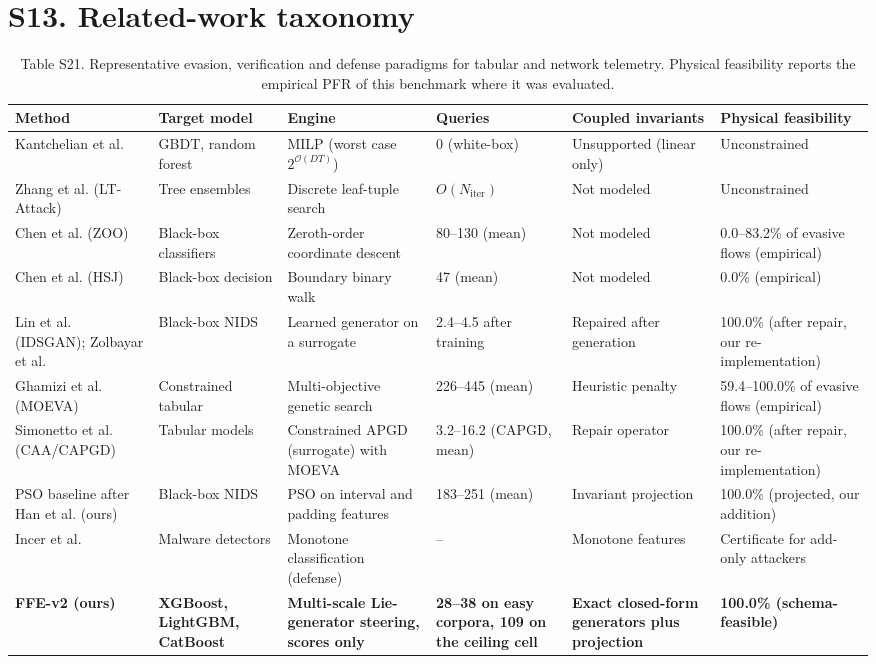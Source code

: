 \section*{S13. Related-work taxonomy}

\begin{table}[!htbp]
\caption*{Table S21. Representative evasion, verification and defense paradigms for tabular and network telemetry. Physical feasibility reports the empirical PFR of this benchmark where it was evaluated.}
\centering
\linespread{1}\selectfont
\footnotesize
\setlength{\tabcolsep}{4pt}
\begin{tabular}{@{}p{2.0cm}p{1.6cm}p{2.4cm}p{1.9cm}p{2.1cm}p{2.1cm}@{}}
\toprule
\textbf{Method} & \textbf{Target model} & \textbf{Engine} & \textbf{Queries} & \textbf{Coupled invariants} & \textbf{Physical feasibility} \\
\midrule
Kantchelian et al. & GBDT, random forest & MILP (worst case $2^{\mathcal{O}(DT)}$) & 0 (white-box) & Unsupported (linear only) & Unconstrained \\
Zhang et al. (LT-Attack) & Tree ensembles & Discrete leaf-tuple search & $O(N_{\text{iter}})$ & Not modeled & Unconstrained \\
Chen et al. (ZOO) & Black-box classifiers & Zeroth-order coordinate descent & 80--130 (mean) & Not modeled & 0.0--83.2\% of evasive flows (empirical) \\
Chen et al. (HSJ) & Black-box decision & Boundary binary walk & 47 (mean) & Not modeled & 0.0\% (empirical) \\
Lin et al. (IDSGAN); Zolbayar et al. & Black-box NIDS & Learned generator on a surrogate & 2.4--4.5 after training & Repaired after generation & 100.0\% (after repair, our re-implementation) \\
Ghamizi et al. (MOEVA) & Constrained tabular & Multi-objective genetic search & 226--445 (mean) & Heuristic penalty & 59.4--100.0\% of evasive flows (empirical) \\
Simonetto et al. (CAA/CAPGD) & Tabular models & Constrained APGD (surrogate) with MOEVA & 3.2--16.2 (CAPGD, mean) & Repair operator & 100.0\% (after repair, our re-implementation) \\
PSO baseline after Han et al. (ours) & Black-box NIDS & PSO on interval and padding features & 183--251 (mean) & Invariant projection & 100.0\% (projected, our addition) \\
Incer et al. & Malware detectors & Monotone classification (defense) & -- & Monotone features & Certificate for add-only attackers \\
\midrule
\textbf{FFE-v2 (ours)} & \textbf{XGBoost, LightGBM, CatBoost} & \textbf{Multi-scale Lie-generator steering, scores only} & \textbf{28--38 on easy corpora, 109 on the ceiling cell} & \textbf{Exact closed-form generators plus projection} & \textbf{100.0\% (schema-feasible)} \\
\bottomrule
\end{tabular}


\end{table}
